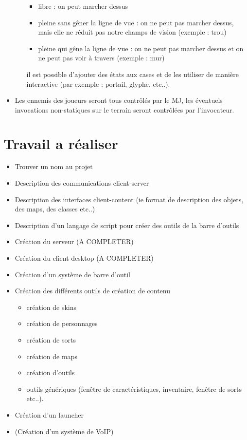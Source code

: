 \documentclass[a4paper]{article}
\begin{document}
\begin{itemize}[label={}]
\begin{itemize}
			\begin{itemize}
				\item libre : on peut marcher dessus
				\item pleine sans gêner la ligne de vue : on ne peut pas marcher dessus, mais elle ne réduit pas notre champs de vision (exemple : trou)
				\item	pleine qui gêne la ligne de vue : on ne peut pas marcher dessus et on ne peut pas voir à travers (exemple : mur)
			\end{itemize}
			il est possible d'ajouter des états aux cases et de les utiliser de manière interactive (par exemple : portail, glyphe, etc..).
		\end{itemize}
		\item Les ennemis des joueurs seront tous contrôlés par le MJ, les éventuels invocations non-statiques sur le terrain seront contrôlées par l'invocateur.
	\end{itemize}
	
	\section{Travail a réaliser}
	
	\begin{itemize}[label={}]
		\item {\huge Trouver un nom au projet}
		\item Description des communications client-server
		\item Description des interfaces client-content (ie format de description des objets, des maps, des classes etc..)
		\item Description d'un langage de script pour créer des outils de la barre d'outils
		\item Création du serveur (A COMPLETER)
		\item Création du client desktop (A COMPLETER)
		\item Création d'un système de barre d'outil
		\item Création des différents outils de création de contenu
		\begin{itemize}
			\item création de skins
			\item création de personnages
			\item création de sorts
			\item création de maps
			\item création d'outils
			\item outils génériques (fenêtre de caractéristiques, inventaire, fenêtre de sorts etc..).
		\end{itemize}
		\item Création d'un launcher
		\item (Création d'un système de VoIP)
	\end{itemize}
	
\end{document}

